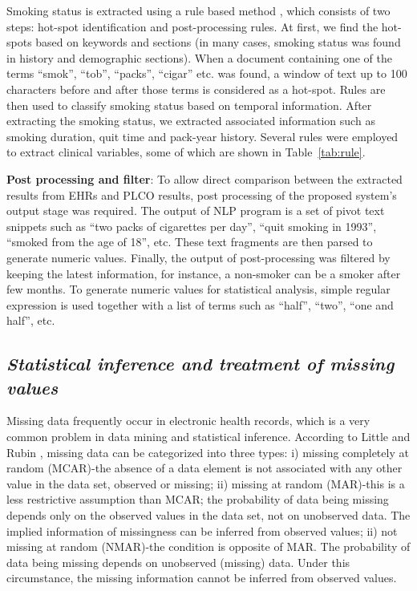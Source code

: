 \documentclass{amia}
\begin{document}
Smoking status is extracted using a rule based method \cite{cohen2008five, uzuner2008identifying}, which consists of two steps: hot-spot identification and post-processing rules. At first, we find the hot-spots based on keywords and sections (in many cases, smoking status was found in history and demographic sections). When a document containing one of the terms ``smok'', ``tob'', ``packs'', ``cigar'' etc. was found, a window of text up to 100 characters before and after those terms is considered as a hot-spot. Rules are then used to classify smoking status based on temporal information. After extracting the smoking status, we extracted associated information such as smoking duration, quit time and pack-year history. Several rules were employed to extract clinical variables, some of which are shown in Table~\ref{tab:rule}.

\textbf {Post processing and filter}:
To allow direct comparison between the extracted results from EHRs and PLCO results, post processing of the proposed system's output stage was required. The output of NLP program is a set of pivot text snippets such as ``two packs of cigarettes per day'', ``quit smoking in 1993'', ``smoked from the age of 18'', etc. These text fragments are then parsed to generate numeric values. Finally, the output of post-processing was filtered by keeping the latest information, for instance, a non-smoker can be a smoker after few months. To generate numeric values for statistical analysis, simple regular expression is used together with a list of terms such as ``half'', ``two'', ``one and half'', etc.

\subsection*{\textit{Statistical inference and treatment of missing values}}
Missing data frequently occur in electronic health records, which is a very common problem in data mining and statistical inference. According to Little and Rubin \cite{little2014statistical,rubin1976inference}, missing data can be categorized into three types: i) missing completely at random (MCAR)-the absence of a data element is not associated with any other value in the data set, observed or missing; ii) missing at random (MAR)-this is a less restrictive assumption than MCAR; the probability of data being missing depends only on the observed values in the data set, not on unobserved data. The implied information of missingness can be inferred from observed values; ii) not missing at random (NMAR)-the condition is opposite of MAR. The probability of data being missing depends on unobserved (missing) data. Under this circumstance, the missing information cannot be inferred from observed values. 
\end{document}

